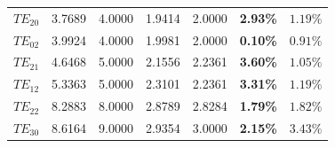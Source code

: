 \documentclass[preprint,12pt]{elsarticle}
\begin{document}
\begin{table}[!t]
{\begin{tabular}{ccccccc}
            $TE_{20}$                                                                        & 3.7689                                                    & 4.0000                                                    & 1.9414                                                 & 2.0000                                                 & \textbf{2.93\%}                                 & $1.19\%$                                      \\
            $TE_{02}$                                                                        & 3.9924                                                    & 4.0000                                                    & 1.9981                                                 & 2.0000                                                 & \textbf{0.10\%}                                 & $0.91\%$                                      \\
            $TE_{21}$                                                                        & 4.6468                                                    & 5.0000                                                    & 2.1556                                                 & 2.2361                                                 & \textbf{3.60\%}                                 & $1.05\%$                                      \\
            $TE_{12}$                                                                        & 5.3363                                                    & 5.0000                                                    & 2.3101                                                 & 2.2361                                                 & \textbf{3.31\%}                                 & $1.19\%$                                      \\
            $TE_{22}$                                                                        & 8.2883                                                    & 8.0000                                                    & 2.8789                                                 & 2.8284                                                 & \textbf{1.79\%}                                 & $1.82\%$                                      \\
            $TE_{30}$                                                                        & 8.6164                                                    & 9.0000                                                    & 2.9354                                                 & 3.0000                                                 & \textbf{2.15\%}                                 & $3.43\%$                                      \\

\end{tabular}}
\end{table}
\end{document}
